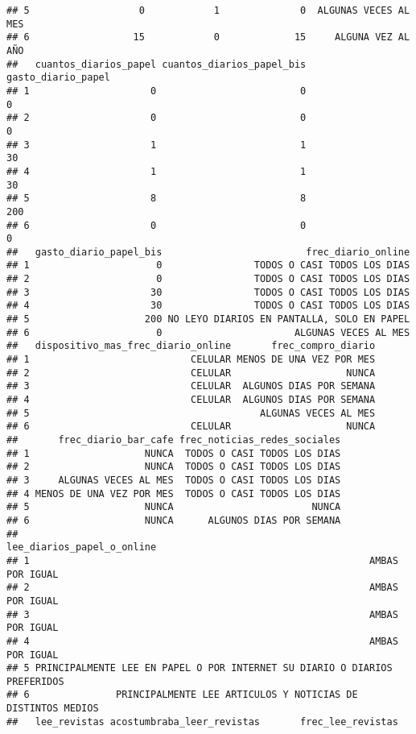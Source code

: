 \documentclass[
]{article}
\begin{document}
\begin{verbatim}
## 5                   0            1              0  ALGUNAS VECES AL MES
## 6                  15            0             15     ALGUNA VEZ AL AÑO
##   cuantos_diarios_papel cuantos_diarios_papel_bis gasto_diario_papel
## 1                     0                         0                  0
## 2                     0                         0                  0
## 3                     1                         1                 30
## 4                     1                         1                 30
## 5                     8                         8                200
## 6                     0                         0                  0
##   gasto_diario_papel_bis                         frec_diario_online
## 1                      0                TODOS O CASI TODOS LOS DIAS
## 2                      0                TODOS O CASI TODOS LOS DIAS
## 3                     30                TODOS O CASI TODOS LOS DIAS
## 4                     30                TODOS O CASI TODOS LOS DIAS
## 5                    200 NO LEYO DIARIOS EN PANTALLA, SOLO EN PAPEL
## 6                      0                       ALGUNAS VECES AL MES
##   dispositivo_mas_frec_diario_online       frec_compro_diario
## 1                            CELULAR MENOS DE UNA VEZ POR MES
## 2                            CELULAR                    NUNCA
## 3                            CELULAR  ALGUNOS DIAS POR SEMANA
## 4                            CELULAR  ALGUNOS DIAS POR SEMANA
## 5                                        ALGUNAS VECES AL MES
## 6                            CELULAR                    NUNCA
##       frec_diario_bar_cafe frec_noticias_redes_sociales
## 1                    NUNCA  TODOS O CASI TODOS LOS DIAS
## 2                    NUNCA  TODOS O CASI TODOS LOS DIAS
## 3     ALGUNAS VECES AL MES  TODOS O CASI TODOS LOS DIAS
## 4 MENOS DE UNA VEZ POR MES  TODOS O CASI TODOS LOS DIAS
## 5                    NUNCA                        NUNCA
## 6                    NUNCA      ALGUNOS DIAS POR SEMANA
##                                                  lee_diarios_papel_o_online
## 1                                                           AMBAS POR IGUAL
## 2                                                           AMBAS POR IGUAL
## 3                                                           AMBAS POR IGUAL
## 4                                                           AMBAS POR IGUAL
## 5 PRINCIPALMENTE LEE EN PAPEL O POR INTERNET SU DIARIO O DIARIOS PREFERIDOS
## 6               PRINCIPALMENTE LEE ARTICULOS Y NOTICIAS DE DISTINTOS MEDIOS
##   lee_revistas acostumbraba_leer_revistas       frec_lee_revistas

\end{verbatim}
\end{document}
